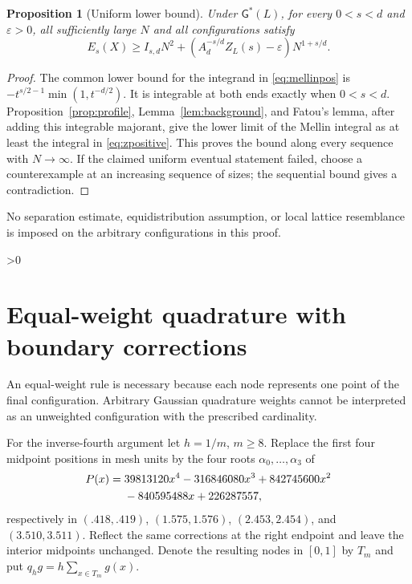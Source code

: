 \documentclass[11pt,a4paper]{article}
\newtheorem{proposition}[theorem]{Proposition}
\theoremstyle{definition}
\newcommand{\G}{\mathsf G}
\newcommand{\eps}{\varepsilon}
\numberwithin{equation}{section}
\let\originalsection\section
\renewcommand{\section}{\ifnum\value{section}>0\clearpage\fi\originalsection}
\begin{document}
\begin{proposition}[Uniform lower bound]\label{prop:positive-lower}
Under $\G^*(L)$, for every $0<s<d$ and $\eps>0$, all sufficiently large $N$ and all configurations satisfy
\begin{equation}
 E_s(X)\ge I_{s,d}N^2+(A_d^{-s/d}Z_L(s)-\eps)N^{1+s/d}.
\end{equation}
\end{proposition}
\begin{proof}
The common lower bound for the integrand in \eqref{eq:mellinpos} is
$-t^{s/2-1}\min(1,t^{-d/2})$. It is integrable at both ends exactly when $0<s<d$. Proposition~\ref{prop:profile}, Lemma~\ref{lem:background}, and Fatou's lemma, after adding this integrable majorant, give the lower limit of the Mellin integral as at least the integral in \eqref{eq:zpositive}. This proves the bound along every sequence with $N\to\infty$. If the claimed uniform eventual statement failed, choose a counterexample at an increasing sequence of sizes; the sequential bound gives a contradiction.
\end{proof}
No separation estimate, equidistribution assumption, or local lattice resemblance is imposed on the arbitrary configurations in this proof.

\section{Equal-weight quadrature with boundary corrections}\label{sec:quadrature}
An equal-weight rule is necessary because each node represents one point of the final configuration. Arbitrary Gaussian quadrature weights cannot be interpreted as an unweighted configuration with the prescribed cardinality.

For the inverse-fourth argument let $h=1/m$, $m\ge8$. Replace the first four midpoint positions in mesh units by the four roots $\alpha_0,\ldots,\alpha_3$ of
\begin{align}
 P(x)={}&39813120x^4-316846080x^3+842745600x^2 \notag\\
        &-840595488x+226287557,
\end{align}
respectively in $(.418,.419)$, $(1.575,1.576)$, $(2.453,2.454)$, and $(3.510,3.511)$. Reflect the same corrections at the right endpoint and leave the interior midpoints unchanged. Denote the resulting nodes in $[0,1]$ by $T_m$ and put $q_hg=h\sum_{x\in T_m}g(x)$.
\end{document}
